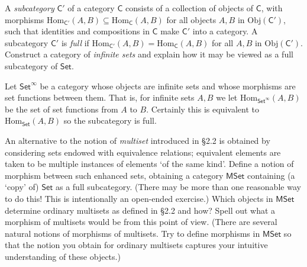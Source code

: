 \documentclass[../../master.tex]{subfiles}
\begin{document}
    \begin{problem}
      A \textit{subcategory} \(\mathsf{C'}\) of a category \(\mathsf{C}\) consists of a collection of objects of \(\mathsf{C}\),
      with morphisms \(\text{Hom}_{\mathsf{C'}}(A, B) \subseteq \text{Hom}_{\mathsf{C}}(A, B)\) for all objects \(A, B\) in \(\text{Obj}(\mathsf{C'})\),
      such that identities and compositions in \(\mathsf{C}\) make \(\mathsf{C'}\) into a category.
      A subcategory \(\mathsf{C'}\) is \textit{full} if \(\text{Hom}_{\mathsf{C'}}(A, B) = \text{Hom}_{\mathsf{C}}(A, B)\) for all \(A, B\) in \(\text{Obj}(\mathsf{C'})\).
      Construct a category of \textit{infinite sets} and explain how it may be viewed as a full subcategory of \(\mathsf{Set}\).
    \end{problem}

    \begin{solution}
      Let \(\mathsf{Set}^{\infty}\) be a category whose objects are infinite sets and whose morphisms are set functions between them.
      That is, for infinite sets \(A, B\) we let \(\text{Hom}_{\mathsf{Set}^{\infty}}(A, B)\) be the set of set functions from \(A\) to \(B\).
      Certainly this is equivalent to \(\text{Hom}_{\mathsf{Set}}(A, B)\) so the subcategory is full.
    \end{solution}

    \begin{problem}
      An alternative to the notion of \textit{multiset} introduced in \S 2.2 is obtained by considering sets endowed with equivalence relations;
      equivalent elements are taken to be multiple instances of elements `of the same kind'.
      Define a notion of morphism between such enhanced sets, obtaining a category \(\mathsf{MSet}\) containing (a `copy' of) \(\mathsf{Set}\) as a full subcategory.
      (There may be more than one reasonable way to do this! This is intentionally an open-ended exercise.)
      Which objects in \(\mathsf{MSet}\) determine ordinary multisets as defined in \S 2.2 and how?
      Spell out what a morphism of multisets would be from this point of view.
      (There are several natural notions of morphisms of multisets.
      Try to define morphisms in \(\mathsf{MSet}\) so that the notion you obtain for ordinary multisets captures your intuitive understanding of these objects.)
    \end{problem}
\end{document}
